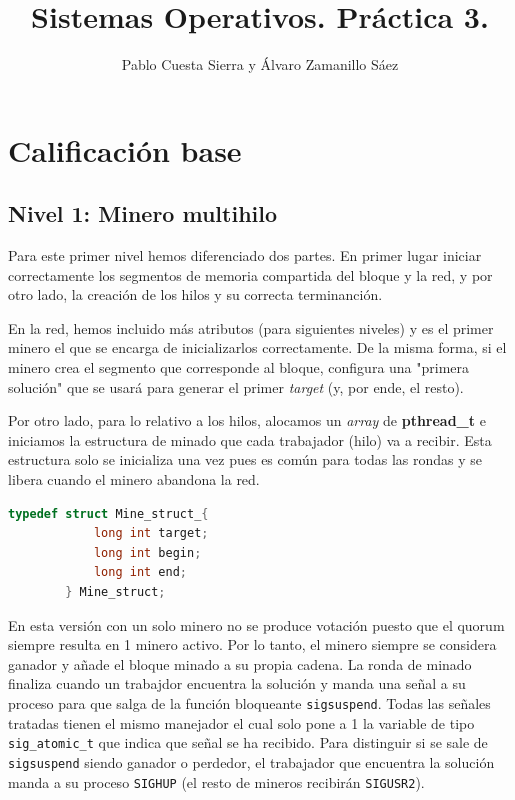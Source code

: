 \documentclass{article}
\begin{document}
\title{Sistemas Operativos. Práctica 3.}
\author{Pablo Cuesta Sierra y Álvaro Zamanillo Sáez}
\date{}
\maketitle

\begin{tcolorbox}
\tableofcontents
\end{tcolorbox}

\pagebreak

\section*{Calificación base}

\subsection*{Nivel 1: Minero multihilo}

    Para este primer nivel hemos diferenciado dos partes. En primer lugar iniciar correctamente los segmentos de memoria compartida del bloque y la red, y por otro lado, la creación de los hilos y su correcta terminanción. 

    En la red, hemos incluido más atributos (para siguientes niveles) y es el primer minero el que se encarga de inicializarlos correctamente.
    De la misma forma, si el minero crea el segmento que corresponde al bloque, configura una "primera solución" que se usará para generar el primer \textit{target} (y, por ende, el resto).

    Por otro lado, para lo relativo a los hilos, alocamos un \textit{array} de \textbf{pthread\_t} e iniciamos la estructura de minado que cada trabajador (hilo) va a recibir. Esta estructura solo se inicializa una vez pues es común para todas las rondas y se libera cuando el minero abandona la red. 
    
    \begin{lstlisting}[language=C]
        typedef struct Mine_struct_{
            long int target;
            long int begin;
            long int end;
        } Mine_struct;  \end{lstlisting}


    En esta versión con un solo minero no se produce votación puesto que el quorum siempre resulta en 1 minero activo. Por lo tanto, el minero siempre se considera ganador y añade el bloque minado a su propia cadena. La ronda de minado finaliza cuando un trabajdor encuentra la solución y manda una señal a su proceso para que salga de la función bloqueante \texttt{sigsuspend}. Todas las señales tratadas tienen el mismo manejador el cual solo pone a 1 la variable de tipo \texttt{sig\_atomic\_t} que indica que señal se ha recibido. Para distinguir si se sale de \texttt{sigsuspend} siendo ganador o perdedor, el trabajador que encuentra la solución manda a su proceso \texttt{SIGHUP} (el resto de mineros recibirán \texttt{SIGUSR2}).
\end{document}
